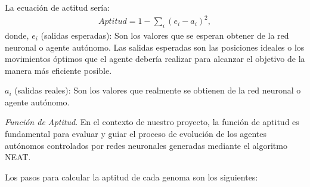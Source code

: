 \documentclass[lettersize, journal]{IEEEtran}
\begin{document}
La ecuación de actitud sería:
\begin{align*}
    Aptitud = 1 - \sum_{i} (e_i - a_i)^2,
\end{align*}
donde, $e_i$ (salidas esperadas): Son los valores que se esperan obtener de la red neuronal o agente autónomo. Las salidas esperadas son las posiciones ideales o los movimientos óptimos que el agente debería realizar para alcanzar el objetivo de la manera más eficiente posible. 

$a_i$ (salidas reales): Son los valores que realmente se obtienen de la red neuronal o agente autónomo. 

\textit{Función de Aptitud}. En el contexto de nuestro proyecto, la función de aptitud es fundamental para evaluar y guiar el proceso de evolución de los agentes autónomos controlados por redes neuronales generadas mediante el algoritmo NEAT. 

Los pasos para calcular la aptitud de cada genoma son los siguientes:
\end{document}
